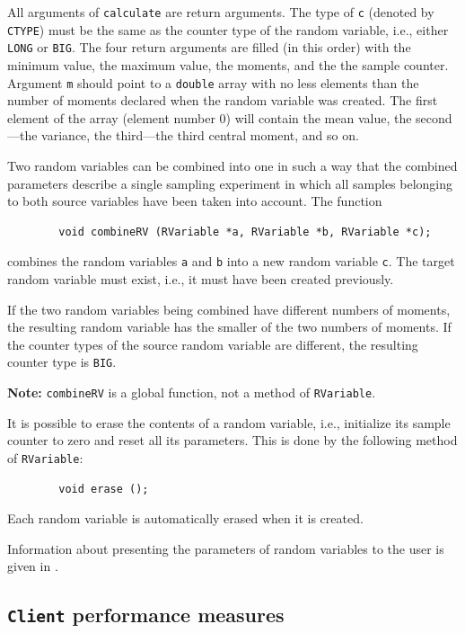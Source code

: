 All arguments of {\tt calculate} are return arguments.
The type of {\tt c} (denoted by {\tt CTYPE})
must be the same as the counter type of the random variable, i.e.,
either {\tt LONG} or {\tt BIG}.
The four return arguments are filled (in this order)
with the minimum value, the maximum value, the moments, and the
the sample counter.
Argument {\tt m} should point
to a {\tt double} array with no less elements than the number of moments
declared when the random variable was created.
The first element of the array (element number 0) will contain
the mean value, the second---the variance, the third---the third
central moment, and so on.

Two random variables can be combined into one in such a way that the
combined parameters describe a single sampling experiment in which all
samples belonging to both source variables have been taken into account.
The function
\begin{verbatim}
        void combineRV (RVariable *a, RVariable *b, RVariable *c);
\end{verbatim}
combines the random variables {\tt a} and {\tt b} into a new random
variable {\tt c}.
The target random variable must exist, i.e., it must have been created
previously.

If the two random variables being combined have
different numbers of moments, the
resulting random variable has the smaller of the two numbers of moments.
If the counter types of the source random variable are
different, the resulting counter type is {\tt BIG}.

\medskip

\noindent
{\bf Note:} {\tt combineRV} is a global function, not a method of
{\tt RVariable}.

\medskip

It is possible to erase the contents of a random variable, i.e., initialize
its sample counter to zero and reset all its parameters.
This is done by the following method of {\tt RVariable}:
\begin{verbatim}
        void erase ();
\end{verbatim}
Each random variable is automatically erased when it is created.

Information about presenting the parameters of random variables to the
user is given in .

\subsection{{\tt Client} performance measures}
\label{rm_pm_cl}

